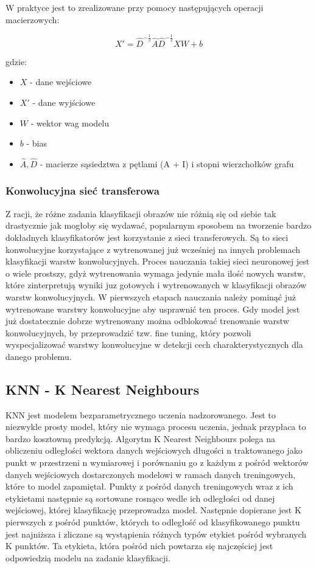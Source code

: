 \documentclass{article}
\begin{document}
W praktyce jest to zrealizowane przy pomocy następujących operacji macierzowych:

\begin{equation}
    X' = \hat{D}^{-\frac{1}{2}} \hat{A} \hat{D}^{-\frac{1}{2}} X W + b
\end{equation}

gdzie:
\begin{itemize}
    \item $X$ - dane wejściowe
    \item $X'$ - dane wyjściowe
    \item $W$ - wektor wag modelu
    \item $b$ - bias
    \item $\hat{A}, \hat{D}$ - macierze sąsiedztwa z pętlami (A + I) i stopni
    wierzchołków grafu
\end{itemize}

\subsubsection{Konwolucyjna sieć transferowa}
Z racji, że różne zadania klasyfikacji obrazów nie różnią się od siebie tak drastycznie jak 
mogłoby się wydawać, popularnym sposobem na tworzenie bardzo dokładnych 
klasyfikatorów jest korzystanie z sieci transferowych. Są to sieci konwolucyjne korzystające 
z wytrenowanej już wcześniej na innych problemach klasyfikacji warstw konwolucyjnych. 
Proces nauczania takiej sieci neuronowej jest o wiele prostszy, gdyż wytrenowania wymaga 
jedynie mała ilość nowych warstw, które zinterpretują wyniki juz gotowych i wytrenowanych 
w klasyfikacji obrazów warstw konwolucyjnych. W pierwszych etapach nauczania należy pominąć 
już wytrenowane warstwy konwolucyjne aby usprawnić ten proces. Gdy model jest już dostatecznie 
dobrze wytrenowany można odblokować trenowanie warstw konwolucyjnych, by przeprowadzić tzw. 
fine tuning, który pozwoli wyspecjalizować warstwy konwolucyjne w detekcji cech charakterystycznych
dla danego problemu.


\subsection{KNN - K Nearest Neighbours}
KNN jest modelem bezparametrycznego uczenia nadzorowanego. Jest to niezwykle prosty model,
 który nie wymaga procesu uczenia, jednak przypłaca to bardzo kosztowną predykcją.
Algorytm K Nearest Neighbours polega na obliczeniu odległości wektora danych wejściowych 
długości n traktowanego jako punkt w przestrzeni n wymiarowej i porównaniu go z każdym z 
pośród wektorów danych wejściowych dostarczonych modelowi w ramach danych treningowych, 
które to model zapamiętał. Punkty z pośród danych treningowych wraz z ich etykietami 
następnie są sortowane rosnąco wedle ich odległości od danej wejściowej, której 
klasyfikację przeprowadza model. Następnie dopierane jest K pierwszych z pośród 
punktów, których to odległość od klasyfikowanego punktu jest najniższa i zliczane 
są wystąpienia różnych typów etykiet pośród wybranych K punktów. Ta etykieta, 
która pośród nich powtarza się najczęściej jest odpowiedzią modelu na zadanie klasyfikacji.
\end{document}
